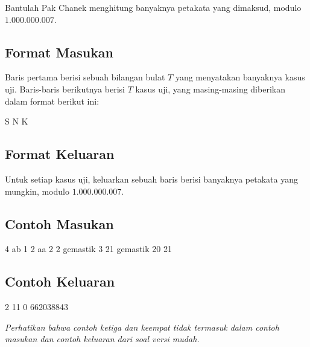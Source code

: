 \documentclass[../main_problemset.tex]{subfiles} %
\begin{document}
Bantulah Pak Chanek menghitung banyaknya petakata yang dimaksud, modulo $ 1.000.000.007 $.

\subsection*{Format Masukan}

Baris pertama berisi sebuah bilangan bulat $ T $ yang menyatakan banyaknya kasus uji. Baris-baris berikutnya berisi $ T $ kasus uji, yang masing-masing diberikan dalam format berikut ini:

\begin{lcverbatim}
S N K
\end{lcverbatim}

\subsection*{Format Keluaran}

Untuk setiap kasus uji, keluarkan sebuah baris berisi banyaknya petakata yang mungkin, modulo $ 1.000.000.007 $.

\vspace{.4cm}

\begin{minipage}[t]{0.5\textwidth}
\subsection*{Contoh Masukan}

\begin{lcverbatim}
4
ab 1 2
aa 2 2
gemastik 3 21
gemastik 20 21
\end{lcverbatim}
\end{minipage}
\begin{minipage}[t]{0.5\textwidth}
\subsection*{Contoh Keluaran}

\begin{lcverbatim}
2
11
0
662038843
\end{lcverbatim}
\end{minipage}

\textit{Perhatikan bahwa contoh ketiga dan keempat tidak termasuk dalam contoh masukan dan contoh keluaran dari soal versi mudah.}
\end{document}
